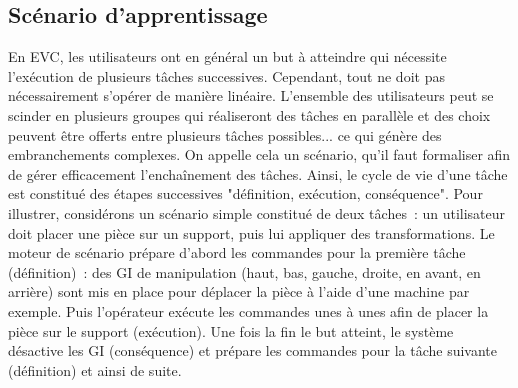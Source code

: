 \documentclass[11pt]{article}
\begin{document}
\subsection{Scénario d'apprentissage}
En EVC, les utilisateurs ont en général un but à atteindre qui nécessite l'exécution de plusieurs tâches successives. Cependant, tout ne doit pas nécessairement s'opérer de manière linéaire. L'ensemble des utilisateurs peut se scinder en plusieurs groupes qui réaliseront des tâches en parallèle et des choix peuvent être offerts entre plusieurs tâches possibles... ce qui génère des embranchements complexes. On appelle cela un scénario, qu'il faut formaliser afin de gérer efficacement l'enchaînement des tâches. Ainsi, le cycle de vie d'une tâche est constitué des étapes successives "définition, exécution, conséquence". Pour illustrer, considérons un scénario simple constitué de deux tâches~: un utilisateur doit placer une pièce sur un support, puis lui appliquer des transformations. Le moteur de scénario prépare d'abord les commandes pour la première tâche (définition)~: des GI de manipulation (haut, bas, gauche, droite, en avant, en arrière) sont mis en place pour déplacer la pièce à l'aide d'une machine par exemple. Puis l'opérateur exécute les commandes unes à unes afin de placer la pièce sur le support (exécution). Une fois la fin le but atteint, le système désactive les GI (conséquence) et prépare les commandes pour la tâche suivante (définition) et ainsi de suite.
\\
\end{document}

